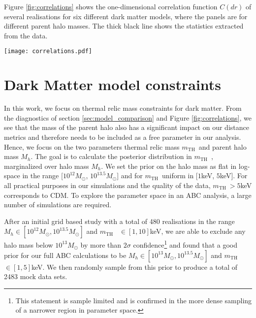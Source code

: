 \documentclass[a4paper,11pt]{article}
\def \mth {\ensuremath{m_{\text{TH}}}~}
\begin{document}
Figure \ref{fig:correlations} shows the one-dimensional correlation function $C(dr)$ of several realisations for six different dark matter models, where the panels are for different parent halo masses. The thick black line shows the statistics extracted from the data.


\begin{figure*}
  \centering
  \texttt{[image: correlations.pdf]}
  \caption{Correlation function of the excess residuals $C(dr)$ of several realisations for six different dark matter models, where the panel are for different parent halo masses. Top left to bottom right: Increasing parent halo mass. Bold black line indicates the distribution of the data. Continuous lines are the mean distribution for the different dark matter models. Dashed lines are individual realizations of the mocks.}
  \label{fig:correlations}
\end{figure*}






\section{Dark Matter model constraints} \label{sec:dm_constraints}

In this work, we focus on thermal relic mass constraints for dark matter. From the diagnostics of section \ref{sec:model_comparison} and Figure \ref{fig:correlations}, we see that the mass of the parent halo also has a significant impact on our distance metrics and therefore needs to be included as a free parameter in our analysis. Hence, we focus on the two parameters thermal relic mass \mth  and parent halo mass $M_h$. The goal is to calculate the posterior distribution in \mth, marginalized over halo mass $M_h$. We set the prior on the halo mass as flat in log-space in the range [$10^{12}M_{\odot}$, $10^{13.5}M_{\odot}$] and for \mth  uniform in [$1$keV, $5$keV]. For all practical purposes in our simulations and the quality of the data, $\mth > 5$keV corresponds to CDM. To explore the parameter space in an ABC analysis, a large number of simulations are required. 

After an initial grid based study with a total of 480 realisations in the range $M_h \in [10^{12}M_{\odot}, 10^{13.5}M_{\odot}]$ and \mth
$\in [1,10]$keV, we are able to exclude any halo mass below $10^{13}M_{\odot}$ by more than $2\sigma$ confidence\footnote{This statement is sample limited and is confirmed in the more dense sampling of a narrower region in parameter space.} and found that a good prior for our full ABC calculations to be $M_h \in [10^{13}M_{\odot}, 10^{13.5}M_{\odot}]$ and \mth
$\in [1,5]$keV. We then randomly sample from this prior to produce a total of 2483 mock data sets.
\end{document}
